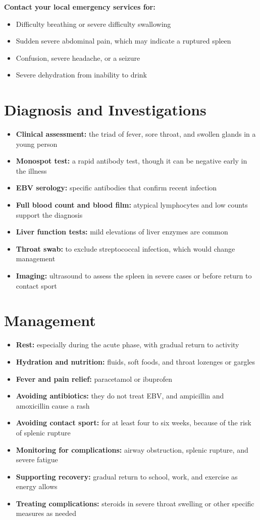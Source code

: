 \textbf{Contact your local emergency services for:}
\begin{itemize}
    \item Difficulty breathing or severe difficulty swallowing
    \item Sudden severe abdominal pain, which may indicate a ruptured spleen
    \item Confusion, severe headache, or a seizure
    \item Severe dehydration from inability to drink
\end{itemize}

\section*{Diagnosis and Investigations}
\begin{itemize}
    \item \textbf{Clinical assessment:} the triad of fever, sore throat, and swollen glands in a young person
    \item \textbf{Monospot test:} a rapid antibody test, though it can be negative early in the illness
    \item \textbf{EBV serology:} specific antibodies that confirm recent infection
    \item \textbf{Full blood count and blood film:} atypical lymphocytes and low counts support the diagnosis
    \item \textbf{Liver function tests:} mild elevations of liver enzymes are common
    \item \textbf{Throat swab:} to exclude streptococcal infection, which would change management
    \item \textbf{Imaging:} ultrasound to assess the spleen in severe cases or before return to contact sport
\end{itemize}

\section*{Management}
\begin{itemize}
    \item \textbf{Rest:} especially during the acute phase, with gradual return to activity
    \item \textbf{Hydration and nutrition:} fluids, soft foods, and throat lozenges or gargles
    \item \textbf{Fever and pain relief:} paracetamol or ibuprofen
    \item \textbf{Avoiding antibiotics:} they do not treat EBV, and ampicillin and amoxicillin cause a rash
    \item \textbf{Avoiding contact sport:} for at least four to six weeks, because of the risk of splenic rupture
    \item \textbf{Monitoring for complications:} airway obstruction, splenic rupture, and severe fatigue
    \item \textbf{Supporting recovery:} gradual return to school, work, and exercise as energy allows
    \item \textbf{Treating complications:} steroids in severe throat swelling or other specific measures as needed
\end{itemize}

